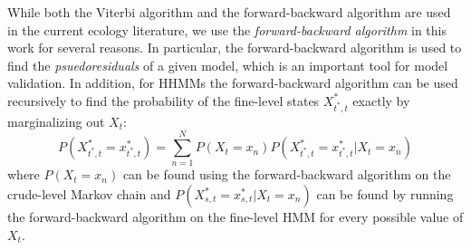 While both the Viterbi algorithm and the forward-backward algorithm are used in the current ecology literature, we use the \textit{forward-backward algorithm} in this work for several reasons. In particular, the forward-backward algorithm is used to find the \textit{psuedoresiduals} of a given model, which is an important tool for model validation. In addition, for HHMMs the forward-backward algorithm can be used recursively to find the probability of the fine-level states $X^*_{t^*,t}$ exactly by marginalizing out $X_t$:
%
$$P(X^*_{t^*,t} = x^*_{t^*,t}) = \sum_{n=1}^N P(X_t = x_n)P(X^*_{t^*,t} = x^*_{t^*,t} | X_t = x_n)$$
%
where $P(X_t = x_n)$ can be found using the forward-backward algorithm on the crude-level Markov chain and $P(X^*_{s,t} = x^*_{s,t} | X_t = x_n)$ can be found by running the forward-backward algorithm on the fine-level HMM for every possible value of $X_t$.